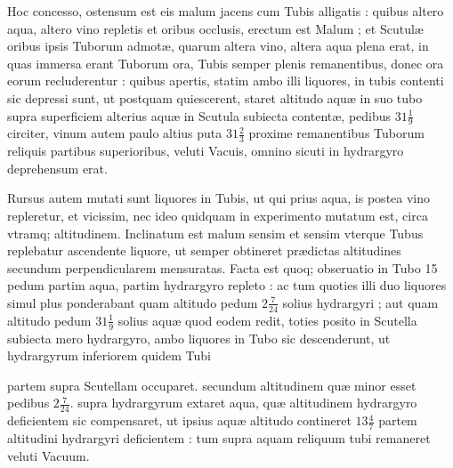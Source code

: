 \documentclass[11pt,a4paper]{article}
\begin{document}
Hoc concesso, ostensum est eis malum jacens cum Tubis alligatis : quibus altero aqua, altero vino repletis et oribus occlusis, erectum est Malum ; et Scutulæ oribus ipsis Tuborum admotæ, quarum altera vino, altera aqua plena erat, in quas immersa  erant Tuborum ora, Tubis semper plenis remanentibus, donec ora eorum recluderentur : quibus apertis, statim ambo illi liquores, in tubis contenti sic depressi sunt, ut postquam quiescerent, staret altitudo aquæ in suo tubo supra superficiem alterius aquæ in Scutula subiecta contentæ, pedibus $31\frac{1}{9}$ circiter, vinum autem paulo altius puta $31\frac{2}{3}$ proxime remanentibus Tuborum reliquis partibus \struck{\ill{}} superioribus, veluti Vacuis, omnino sicuti in hydrargyro deprehensum erat.

Rursus autem mutati sunt liquores in Tubis, ut qui prius aqua, is postea vino repleretur, et vicissim, nec ideo quidquam in experimento mutatum est, circa vtramq; altitudinem. Inclinatum est malum sensim et sensim vterque Tubus replebatur ascendente liquore, ut semper obtineret prædictas altitudines secundum perpendicularem mensuratas. Facta est quoq; obseruatio in Tubo 15 pedum partim aqua, partim hydrargyro repleto : ac tum quoties illi duo liquores simul plus ponderabant quam altitudo pedum $2\frac{7}{24}$ solius hydrargyri ; aut quam altitudo pedum $31\frac{1}{9}$ solius aquæ quod eodem redit, toties posito in Scutella subiecta mero hydrargyro, ambo liquores in Tubo sic descenderunt, ut hydrargyrum inferiorem quidem Tubi


partem \struck{\ill{}} supra Scutellam occuparet. secundum altitudinem quæ minor esset pedibus $2\frac{7}{24}$. supra hydrargyrum extaret aqua, quæ altitudinem hydrargyro deficientem sic compensaret, ut ipsius aquæ altitudo contineret $13\frac{4}{7}$ partem altitudini hydrargyri deficientem : tum supra aquam reliquum tubi remaneret veluti Vacuum.
\end{document}
